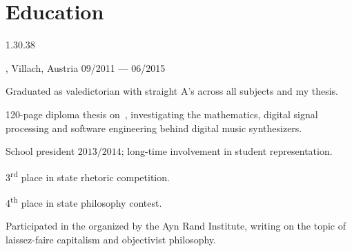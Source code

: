 \section{Education}{1.3}{0.38}
\begin{entry}
	{, Villach, Austria}{}
	{09/2011 --- 06/2015}
	\item Graduated as valedictorian with straight A's across all subjects and my thesis.
  \item 120-page diploma thesis on  \,, investigating the mathematics, digital signal processing and software engineering behind digital music synthesizers.
	\item School president $2013/2014$; long-time involvement in student representation.
  \item 3\textsuperscript{rd} place in state rhetoric competition.
  \item 4\textsuperscript{th} place in state philosophy contest.
  \item Participated in the  organized by the Ayn Rand Institute, writing on the topic of laissez-faire capitalism and objectivist philosophy.
\end{entry}


